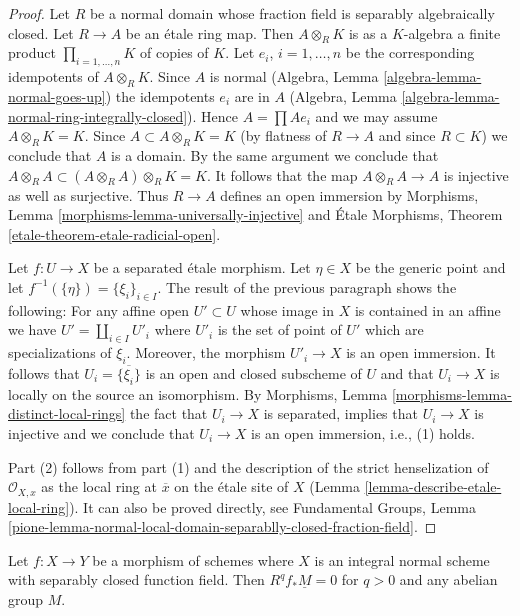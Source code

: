 \begin{proof}
Let $R$ be a normal domain whose fraction field is separably algebraically
closed. Let $R \to A$ be an \'etale ring map. Then
$A \otimes_R K$ is as a $K$-algebra a finite product
$\prod_{i = 1, \ldots, n} K$ of copies of $K$. Let $e_i$, $i = 1, \ldots, n$
be the corresponding idempotents of $A \otimes_R K$. Since $A$ is normal
(Algebra, Lemma \ref{algebra-lemma-normal-goes-up})
the idempotents $e_i$ are in $A$
(Algebra, Lemma \ref{algebra-lemma-normal-ring-integrally-closed}).
Hence $A = \prod Ae_i$ and we may assume $A \otimes_R K = K$.
Since $A \subset A \otimes_R K = K$ (by flatness of $R \to A$ and
since $R \subset K$) we conclude that $A$ is a domain.
By the same argument we conclude that
$A \otimes_R A \subset (A \otimes_R A) \otimes_R K = K$.
It follows that the map $A \otimes_R A \to A$ is
injective as well as surjective. Thus $R \to A$ defines an
open immersion by
Morphisms, Lemma \ref{morphisms-lemma-universally-injective}
and
\'Etale Morphisms, Theorem \ref{etale-theorem-etale-radicial-open}.

\medskip\noindent
Let $f : U \to X$ be a separated \'etale morphism. Let $\eta \in X$
be the generic point and let $f^{-1}(\{\eta\}) = \{\xi_i\}_{i \in I}$.
The result of the previous paragraph shows the following:
For any affine open $U' \subset U$ whose image in $X$ is contained in
an affine we have $U' = \coprod_{i \in I} U'_i$ where $U'_i$
is the set of point of $U'$ which are specializations of $\xi_i$.
Moreover, the morphism $U'_i \to X$ is an open immersion.
It follows that $U_i = \overline{\{\xi_i\}}$ is an open and closed
subscheme of $U$ and that $U_i \to X$ is locally on the source
an isomorphism. By Morphisms,
Lemma \ref{morphisms-lemma-distinct-local-rings}
the fact that $U_i \to X$ is separated, implies that
$U_i \to X$ is injective and we conclude that $U_i \to X$
is an open immersion, i.e., (1) holds.

\medskip\noindent
Part (2) follows from part (1) and the description of the strict
henselization of $\mathcal{O}_{X, x}$ as the local ring at $\overline{x}$
on the \'etale site of $X$ (Lemma \ref{lemma-describe-etale-local-ring}).
It can also be proved directly, see
Fundamental Groups, Lemma
\ref{pione-lemma-normal-local-domain-separablly-closed-fraction-field}.
\end{proof}

\begin{lemma}
\label{lemma-Rf-star-zero-normal-with-alg-closed-function-field}
Let $f : X \to Y$ be a morphism of schemes where $X$ is an integral
normal scheme with separably closed function field. Then
$R^qf_*\underline{M} = 0$ for $q > 0$ and any abelian group $M$.
\end{lemma}

